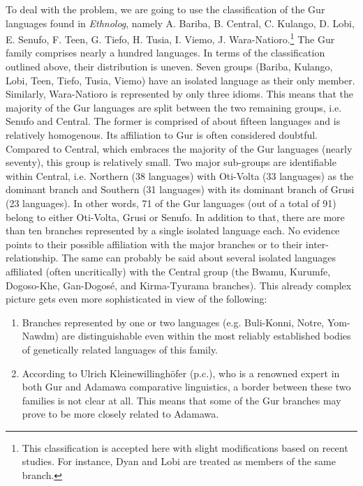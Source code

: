To deal with the problem, we are going to use the classification of the Gur languages found in \textit{Ethnolog}, namely A. Bariba, B. Central, C. Kulango, D. Lobi, E. Senufo, F. Teen, G. Tiefo, H. Tusia, I. Viemo, J. Wara-Natioro.\footnote{This classification is accepted here with slight modifications based on recent studies. For instance, Dyan and Lobi  are treated as members of the same branch.} The Gur family comprises nearly a hundred languages. In terms of the classification outlined above, their distribution is uneven. Seven groups (Bariba, Kulango, Lobi, Teen, Tiefo, Tusia, Viemo) have an isolated language as their only member. Similarly, Wara-Natioro is represented by only three idioms. This means that the majority of the Gur languages are split between the two remaining groups, i.e. Senufo and Central. The former is comprised of about fifteen languages and is relatively homogenous. Its affiliation to Gur is often considered doubtful. Compared to Central, which embraces the majority of the Gur languages (nearly seventy), this group is relatively small. Two major sub-groups are identifiable within Central, i.e. Northern (38 languages) with Oti-Volta (33 languages) as the dominant branch and Southern (31 languages) with its dominant branch of Grusi (23 languages). In other words, 71 of the Gur languages (out of a total of 91) belong to either Oti-Volta, Grusi or Senufo. In addition to that, there are more than ten branches represented by a single isolated language each. No evidence points to their possible affiliation with the major branches or to their inter-relationship. The same can probably be said about several isolated languages affiliated (often uncritically) with the Central group (the Bwamu, Kurumfe, Dogoso-Khe, Gan-Dogosé, and Kirma-Tyurama branches). This already complex picture gets even more sophisticated in view of the following: 

\begin{enumerate}
 \item Branches represented by one or two languages (e.g. Buli-Konni, Notre, Yom-Nawdm) are distinguishable even within the most reliably established bodies of genetically related languages of this family.
 \item  According to Ulrich Kleinewillinghöfer (p.c.), who is a renowned expert in both Gur and Adamawa comparative linguistics, a border between these two families is not clear at all. This means that some of the Gur branches may prove to be more closely related to Adamawa. 
\end{enumerate}
 

